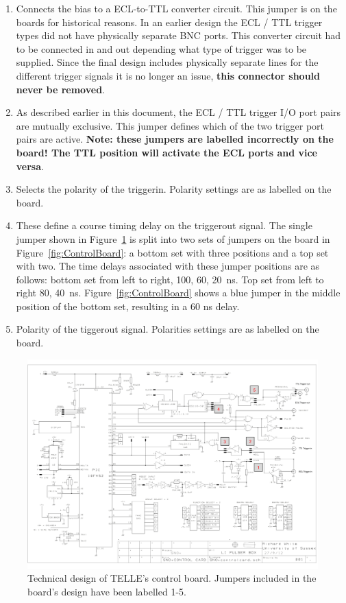 \documentclass[12pt]{report}
\begin{document}
\begin{enumerate}
	\item Connects the bias to a ECL-to-TTL converter circuit. This jumper is on the boards for historical reasons. In an earlier design the ECL / TTL trigger types did not have physically separate BNC ports. This converter circuit had to be connected in and out depending what type of trigger was to be supplied. Since the final design includes physically separate lines for the different trigger signals it is no longer an issue, \textbf{this connector should never be removed}.
	\item As described earlier in this document, the ECL / TTL trigger I/O port pairs are mutually exclusive. This jumper defines which of the two trigger port pairs are active. \textbf{Note: these jumpers are labelled incorrectly on the board! The TTL position will activate the ECL ports and vice versa}. 
	\item Selects the polarity of the trigger\textunderscore in. Polarity settings are as labelled on the board. 
	\item These define a course timing delay on the trigger\textunderscore out signal. The single jumper shown in Figure~\ref{fig:ControlBoardDesign} is split into two sets of jumpers on the board in Figure~\ref{fig:ControlBoard}: a bottom set with three positions and a top set with two. The time delays associated with these jumper positions are as follows: bottom set from left to right, 100, 60, 20~ns. Top set from left to right 80, 40~ns. Figure~\ref{fig:ControlBoard} shows a blue jumper in the middle position of the bottom set, resulting in a 60 ns delay.
	\item Polarity of the tigger\textunderscore out signal. Polarities settings are as labelled on the board.
\end{enumerate}

\begin{figure}[htbp]
	\begin{center}
		\includegraphics[width=1.0\textwidth]{ControlBoardPCB}
		\caption{Technical design of TELLE's control board. Jumpers included in the board's design have been labelled 1-5.}
		\label{fig:ControlBoardDesign}
	\end{center}
\end{figure}
\end{document}
